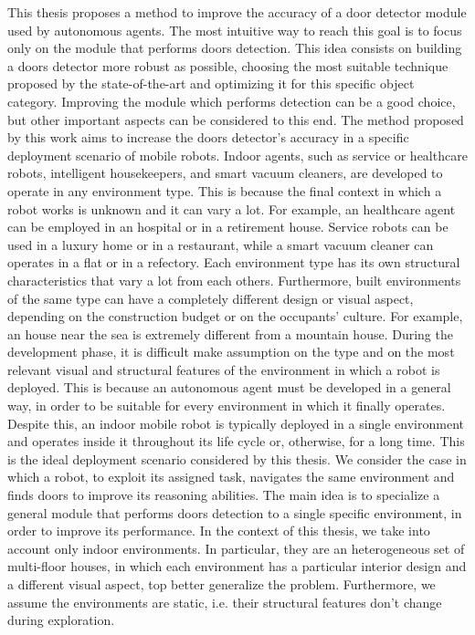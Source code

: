This thesis proposes a method to improve the accuracy of a door detector module used by autonomous agents. The most intuitive way to reach this goal is to focus only on the module that performs doors detection. This idea consists on building a doors detector more robust as possible, choosing the most suitable technique proposed by the state-of-the-art and optimizing it for this specific object category. Improving the module which performs detection can be a good choice, but other important aspects can be considered to this end. The method proposed by this work aims to increase the doors detector's accuracy in a specific deployment scenario of mobile robots. Indoor agents, such as service or healthcare robots, intelligent housekeepers, and smart vacuum cleaners, are developed to operate in any environment type. This is because the final context in which a robot works is unknown and it can vary a lot. For example, an healthcare agent can be employed in an hospital or in a retirement house. Service robots can be used in a luxury home or in a restaurant, while a smart vacuum cleaner can operates in a flat or in a refectory. Each environment type has its own structural characteristics that vary a lot from each others. Furthermore, built environments of the same type can have a completely different design or visual aspect, depending on the construction budget or on the occupants' culture. For example, an house near the sea is extremely different from a mountain house. During the development phase, it is difficult make assumption on the type and on the most relevant visual and structural features of the environment in which a robot is deployed. This is because an autonomous agent must be developed in a general way, in order to be suitable for every environment in which it finally operates. Despite this, an indoor mobile robot is typically deployed in a single environment and operates inside it throughout its life cycle or, otherwise, for a long time. This is the ideal deployment scenario considered by this thesis. We consider the case in which a robot, to exploit its assigned task, navigates the same environment and finds doors to improve its reasoning abilities. The main idea is to specialize a general module that performs doors detection to a single specific environment, in order to improve its performance. In the context of this thesis, we take into account only indoor environments. In particular, they are an heterogeneous set of multi-floor houses, in which each environment has a particular interior design and a different visual aspect, top better generalize the problem. Furthermore, we assume the environments are static, i.e. their structural features don't change during exploration.

